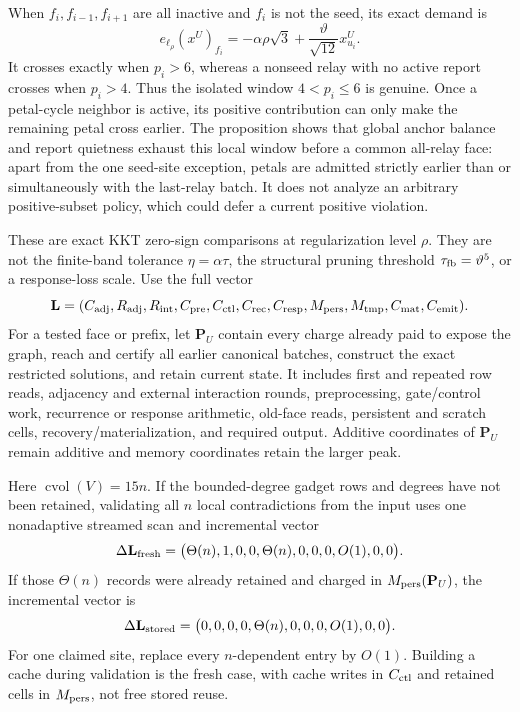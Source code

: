 \begin{remark}
\label{rem:petal-cycle-relay-trace-ledger}
When $f_i,f_{i-1},f_{i+1}$ are all inactive and $f_i$ is not the seed, its
exact demand is
\begin{equation*}
 e_{\ell_\rho}(x^U)_{f_i}
 =-\alpha\rho\sqrt3
  +\frac{\vartheta}{\sqrt{12}}x^U_{u_i}.
\end{equation*}
It crosses exactly when $p_i>6$, whereas a nonseed relay with no active report
crosses when $p_i>4$.  Thus the isolated window $4<p_i\leq6$ is genuine.
Once a petal-cycle neighbor is active, its positive contribution can only
make the remaining petal cross earlier.  The proposition shows that global
anchor balance and report quietness exhaust this local window before a common
all-relay face: apart from the one seed-site exception, petals are admitted
strictly earlier than or simultaneously with the last-relay batch.  It does
not analyze an arbitrary positive-subset policy, which could defer a current
positive violation.

These are exact KKT zero-sign comparisons at regularization level $\rho$.
They are not the finite-band tolerance $\eta=\alpha\tau$, the structural
pruning threshold $\tau_{\rm fb}=\vartheta^5$, or a response-loss scale.  Use
the full vector
\begin{equation*}
 \mathbf L=
 (C_{\rm adj},R_{\rm adj},R_{\rm int},C_{\rm pre},C_{\rm ctl},
  C_{\rm rec},C_{\rm resp},M_{\rm pers},M_{\rm tmp},C_{\rm mat},C_{\rm emit}).
\end{equation*}
For a tested face or prefix, let $\mathbf P_U$ contain every charge already
paid to expose the graph, reach and certify all earlier canonical batches,
construct the exact restricted solutions, and retain current state.  It
includes first and repeated row reads, adjacency and external interaction
rounds, preprocessing, gate/control work, recurrence or response arithmetic,
old-face reads, persistent and scratch cells, recovery/materialization, and
required output.  Additive coordinates of $\mathbf P_U$ remain additive and
memory coordinates retain the larger peak.

Here $\operatorname{cvol}(V)=15n$.  If the bounded-degree gadget rows and
degrees have not been retained, validating all $n$ local contradictions from
the input uses one nonadaptive streamed scan and incremental vector
\begin{equation}
 \Delta\mathbf L_{\rm fresh}
 =\bigl(\Theta(n),1,0,0,\Theta(n),0,0,0,O(1),0,0\bigr).
 \label{eq:petal-cycle-fresh-audit-vector}
\end{equation}
If those $\Theta(n)$ records were already retained and charged in
$M_{\rm pers}(\mathbf P_U)$, the incremental vector is
\begin{equation}
 \Delta\mathbf L_{\rm stored}
 =\bigl(0,0,0,0,\Theta(n),0,0,0,O(1),0,0\bigr).
 \label{eq:petal-cycle-stored-audit-vector}
\end{equation}
For one claimed site, replace every $n$-dependent entry by $O(1)$.  Building
a cache during validation is the fresh case, with cache writes in
$C_{\rm ctl}$ and retained cells in $M_{\rm pers}$, not free stored reuse.


\end{remark}
